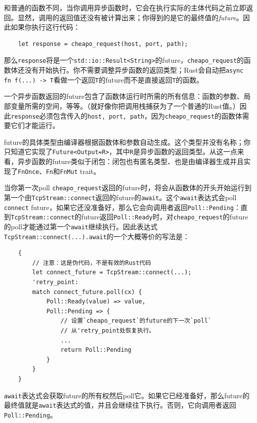 和普通的函数不同，当你调用异步函数时，它会在执行实际的主体代码之前立即返回。显然，调用的返回值还没有被计算出来；你得到的是它的最终值的\emph{future}。因此如果你执行这行代码：
\begin{verbatim}
    let response = cheapo_request(host, port, path);
\end{verbatim}

那么\texttt{response}将是一个\texttt{std::io::Result<String>}的future，\texttt{cheapo\_request}的函数体还没有开始执行。你不需要调整异步函数的返回类型；Rust会自动把\texttt{async fn f(...) -> T}看做一个返回\texttt{T}的future而不是直接返回\texttt{T}的函数。

一个异步函数返回的future包含了函数体运行时所需的所有信息：函数的参数、局部变量所需的空间，等等。（就好像你把调用栈捕获为了一个普通的Rust值。）因此\texttt{response}必须包含传入的\texttt{host, port, path}，因为\texttt{cheapo\_request}的函数体需要它们才能运行。

future的具体类型由编译器根据函数体和参数自动生成。这个类型并没有名称；你只知道它实现了\texttt{Future<Output=R>}，其中\texttt{R}是异步函数的返回类型。从这一点来看，异步函数的future类似于闭包：闭包也有匿名类型、也是由编译器生成并且实现了\texttt{FnOnce}、\texttt{Fn}和\texttt{FnMut} trait。

当你第一次poll \texttt{cheapo\_request}返回的future时，将会从函数体的开头开始运行到第一个由\texttt{TcpStream::connect}返回的future的\texttt{await}。这个\texttt{await}表达式会poll \texttt{connect} future，如果它还没准备好，那么它会向调用者返回\texttt{Poll::Pending}：直到\texttt{TcpStream::connect}的future返回\texttt{Poll::Ready}时，对\texttt{cheapo\_request}的future的poll才能通过第一个\texttt{await}继续执行。因此表达式\texttt{TcpStream::connect(...).await}的一个大概等价的写法是：
\begin{verbatim}
    {
        // 注意：这是伪代码，不是有效的Rust代码
        let connect_future = TcpStream::connect(...);
        'retry_point:
        match connect_future.poll(cx) {
            Poll::Ready(value) => value,
            Poll::Pending => {
                // 设置`cheapo_request`的future的下一次`poll`
                // 从'retry_point处恢复执行。
                ...
                return Poll::Pending
            }
        }
    }
\end{verbatim}

\texttt{await}表达式会获取future的所有权然后poll它。如果它已经准备好，那么future的最终值就是\texttt{await}表达式的值，并且会继续往下执行。否则，它向调用者返回\texttt{Poll::Pending}。

